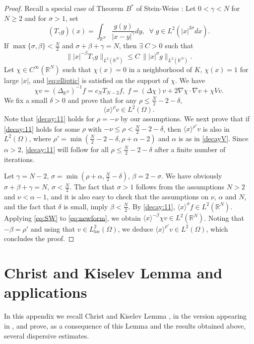 \documentclass[10pt,leqno]{amsart}
\theoremstyle{definition}%
\theoremstyle{remark}
\numberwithin{equation}{section}
\newcommand{\R}{\mathbb{R}}
\renewcommand{\^}{\widehat}%
\begin{document}
\begin{proof}
Recall a special case of Theorem $B^*$  of Stein-Weiss \cite{SW58}: 
Let $0<\gamma<N$ for $N\ge 2$ and for $\sigma >1$,  set 
$$
(T_\gamma g)(x)=\int_{\R^N} \frac{g(y)}{|x-y|^\gamma}dy,\;\;\forall\;g\in L^{2}(|x|^{2\sigma} dx).
$$
If $\max\{\sigma,\beta\}<\frac{N}{2}$ and $\sigma+\beta+\gamma=N$, then 
$\exists\; C>0$ such that 
\begin{equation}
\label{eq:SW}
\bigl \| |x|^{-\beta}T_\gamma g\bigr\|_{L^2(\R^N)}\le C\,\bigl\||x|^\sigma g\bigr\|_{L^2(\R^N)}.
\end{equation}
Let $\chi\in C^{\infty}(\R^N)$ such that $\chi(x)=0$ in a neighborhood of $K$, $\chi(x)=1$ for large $|x|$, and \eqref{eq:elliptic} is satisfied on the support of $\chi$.
We have
\begin{equation}
\label{eq:newform}
\chi v=(\Delta_{\R^N})^{-1}f=c_NT_{N-2}f, \; 
f=(\Delta \chi)v+2\nabla\chi\cdot\nabla v+\chi Vv.
\end{equation}
We fix a small $\delta>0$ and prove that for any $\rho\leq \frac{N}{2}-2-\delta$, 
\begin{equation}
\label{decay:11}\langle x\rangle^{\rho} v\in L^2(\Omega).
\end{equation} 
Note that \eqref{decay:11} holds for $\rho=-\nu$ by our assumptions. We next prove that if \eqref{decay:11} holds for some $\rho$ with $-\nu\leq \rho<\frac{N}{2}-2-\delta$, then $\langle x\rangle^{\rho'}v$ is also in $L^2(\Omega)$, where $\rho'=\min\left( \frac{N}{2}-2-\delta,\rho+\alpha-2 \right)$ and $\alpha$ is as in \eqref{decayV}. Since $\alpha>2$, \eqref{decay:11} will follow for all $\rho\leq\frac{N}{2}-2-\delta$ after a finite number of iterations. 

Let $\gamma=N-2$, $\sigma=\min\left( \rho+\alpha,\frac{N}{2}-\delta \right)$, $\beta=2-\sigma$. We have obviously $\sigma+\beta+\gamma=N$, $\sigma <\frac{N}{2}$. The fact that $\sigma>1$ follows from the assumptions $N>2$ and $\nu<\alpha-1$, and it is also easy to check that the assumptions on $\nu$, $\alpha$ and $N$, and the fact that $\delta$ is small, imply $\beta<\frac N2$. By \eqref{decay:11}, $\langle x\rangle^{\sigma}f\in L^2(\R^N)$.
Applying \eqref{eq:SW} to \eqref{eq:newform},  we obtain 
$\langle x \rangle^{-\beta}\chi v\in L^2(\R^N)$.
Noting that $-\beta=\rho'$ and using that $v\in L^2_{\mathrm{loc}}(\Omega)$, we deduce $\langle x\rangle^{\rho'}v\in L^2(\Omega)$, which concludes the proof.
\end{proof}
\section{Christ and Kiselev Lemma and applications}
\label{A:ChristKiselev}
In this appendix we recall Christ and Kiselev Lemma \cite{ChKi01}, in the version appearing in \cite{SmithSogge00}, and prove, as a consequence of this Lemma and the results obtained above, several dispersive estimates.
\end{document}

